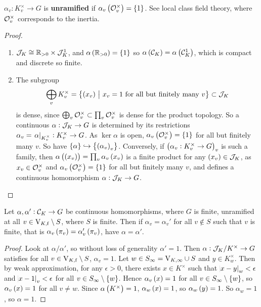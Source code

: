 \begin{notation*}
$ \alpha_v : K_v^\times \to G $ is \textbf{unramified} if $ \alpha_v\br{\OOO_v^\times} = \cbr{1} $. See local class field theory, where $ \mathcal{O}_v^\times $ corresponds to the inertia.
\end{notation*}

\begin{proof}
\hfill
\begin{enumerate}
\item $ \mathcal{J}_K \cong \mathbb{R}_{> 0} \times \mathcal{J}_K^1 $, and $ \alpha\br{\RR_{> 0}} = \cbr{1} $ so $ \alpha\br{\CCC_K} = \alpha\br{\CCC_K^1} $, which is compact and discrete so finite.
\item The subgroup
$$ \bigoplus_v K_v^\times = \cbr{\br{x_v} \st x_v = 1 \ \text{for all but finitely many} \ v} \subset \JJJ_K $$
is dense, since $ \bigoplus_v \mathcal{O}_v^\times \subset \prod_v \mathcal{O}_v^\times $ is dense for the product topology. So a continuous $ \alpha : \mathcal{J}_K \to G $ is determined by its restrictions $ \alpha_v = \left. \alpha \right|_{K_v^\times} : K_v^\times \to G $. As $ \ker \alpha $ is open, $ \alpha_v\br{\OOO_v^\times} = \cbr{1} $ for all but finitely many $ v $. So have $ \cbr{\alpha} \hookrightarrow \cbr{\br{\alpha_v}_v} $. Conversely, if $ \br{\alpha_v : K_v^\times \to G}_v $ is such a family, then $ \alpha\br{\br{x_v}} = \prod_v \alpha_v\br{x_v} $ is a finite product for any $ \br{x_v} \in \JJJ_K $, as $ x_v \in \mathcal{O}_v^\times $ and $ \alpha_v\br{\OOO_v^\times} = \cbr{1} $ for all but finitely many $ v $, and defines a continuous homomorphism $ \alpha : \mathcal{J}_K \to G $.
\end{enumerate}
\end{proof}


\begin{proposition}
\label{prop:7.2}
Let $ \alpha, \alpha' : \mathcal{C}_K \to G $ be continuous homomorphisms, where $ G $ is finite, unramified at all $ v \in \mathrm{V}_{K, \mathrm{f}} \setminus S $, where $ S $ is finite. Then if $ \alpha_v = \alpha_v' $ for all $ v \notin S $ such that $ v $ is finite, that is $ \alpha_v\br{\pi_v} = \alpha_v'\br{\pi_v} $, have $ \alpha = \alpha' $.
\end{proposition}

\begin{proof}
Look at $ \alpha / \alpha' $, so without loss of generality $ \alpha' = 1 $. Then $ \alpha : \mathcal{J}_K / K^\times \to G $ satisfies for all $ v \in \mathrm{V}_{K, \mathrm{f}} \setminus S $, $ \alpha_v = 1 $. Let $ w \in S_\infty = \mathrm{V}_{K, \infty} \cup S $ and $ y \in K_w^\times $. Then by weak approximation, for any $ \epsilon > 0 $, there exists $ x \in K^\times $ such that $ \abs{x - y}_w < \epsilon $ and $ \abs{x - 1}_v < \epsilon $ for all $ v \in S_\infty \setminus \cbr{w} $. Hence $ \alpha_v\br{x} = 1 $ for all $ v \in S_\infty \setminus \cbr{w} $, so $ \alpha_v\br{x} = 1 $ for all $ v \ne w $. Since $ \alpha\br{K^\times} = 1 $, $ \alpha_w\br{x} = 1 $, so $ \alpha_w\br{y} = 1 $. So $ \alpha_w = 1 $, so $ \alpha = 1 $.
\end{proof}

